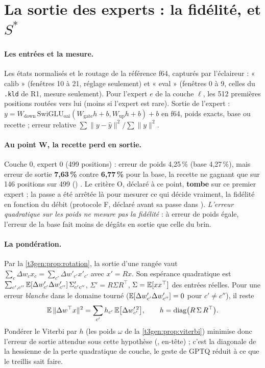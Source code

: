 \section{La sortie des experts : la fidélité, et \texorpdfstring{$S^{*}$}{S*}}\label{t3gen:sec:sortie}

\paragraph{Les entrées et la mesure.} Les états normalisés et le routage de la référence f64, capturés par l'éclaireur : « calib » (fenêtres 10 à 21, réglage seulement) et « eval » (fenêtres 0 à 9, celles du \texttt{.kld} de R1, mesure seulement). Pour l'expert $e$ de la couche $\ell$, les 512 premières positions routées vers lui (moins si l'expert est rare). Sortie de l'expert : $y = W_{\text{down}}\,\mathrm{SwiGLU}_{\text{oai}}(W_{\text{gate}} h + b, W_{\text{up}} h + b) + b$ en f64, poids exacts, base ou recette ; erreur relative $\sum\|y - \hat y\|^2 / \sum\|y\|^2$.

\paragraph{Au point W, la recette perd en sortie.} Couche 0, expert 0 (499 positions) : erreur de poids 4,25\,\% (base 4,27\,\%), mais erreur de sortie \textbf{7,63\,\%} contre \textbf{6,77\,\%} pour la base, la recette ne gagnant que sur 146 positions sur 499 () \mes. Le critère O, déclaré à ce point, \textbf{tombe} sur ce premier expert ; la passe a été arrêtée là pour mesurer ce qui décide vraiment, la fidélité en fonction du débit (protocole F, déclaré avant sa passe dans ). \emph{L'erreur quadratique sur les poids ne mesure pas la fidélité} : à erreur de poids égale, l'erreur de la base fait moins de dégâts en sortie que celle du brin.

\paragraph{La pondération.} Par la \cref{t3gen:prop:rotation}, la sortie d'une rangée vaut $\sum_c \Delta w_c x_c = \sum_{c'} \Delta w'_{c'} x'_{c'}$ avec $x' = Rx$. Son espérance quadratique est $\sum_{c', c''} \mathbb{E}[\Delta w'_{c'} \Delta w'_{c''}]\, \Sigma'_{c'c''}$, $\Sigma' = R\Sigma R^\top$, $\Sigma = \mathbb{E}[xx^\top]$ des entrées réelles. Pour une erreur \emph{blanche} dans le domaine tourné ($\mathbb{E}[\Delta w'_{c'}\Delta w'_{c''}] = 0$ pour $c' \ne c''$), il reste
\begin{equation}\label{t3gen:eq:ponderation}
\mathbb{E}\,\|\Delta w^\top x\|^2 = \sum_{c'} h_{c'}\, \mathbb{E}\bigl[\Delta w'^{\,2}_{c'}\bigr], \qquad h = \mathrm{diag}\bigl(R\,\Sigma\,R^\top\bigr) .
\end{equation}
Pondérer le Viterbi par $h$ (les poids $\omega$ de la \cref{t3gen:prop:viterbi}) minimise donc l'erreur de sortie attendue sous cette hypothèse (, en-tête) \calc ; c'est la diagonale de la hessienne de la perte quadratique de couche, le geste de GPTQ réduit à ce que le treillis sait faire.

